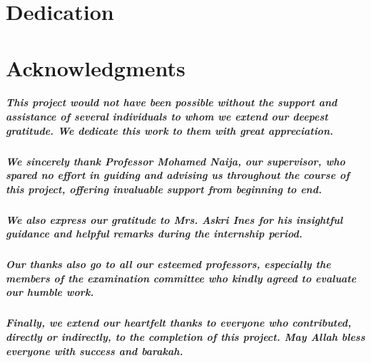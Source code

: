 \documentclass[a4paper,12pt]{report}
\begin{document}

\dominitoc
\newpage
\thispagestyle{empty}
\mbox{}
\newpage

\chapter*{Dedication}
\newpage

\chapter*{Acknowledgments}
\paragraph{This project would not have been possible without the support and assistance of several individuals to whom we extend our deepest gratitude. We dedicate this work to them with great appreciation.}

\paragraph{We sincerely thank Professor Mohamed Naija, our supervisor, who spared no effort in guiding and advising us throughout the course of this project, offering invaluable support from beginning to end.}

\paragraph{We also express our gratitude to Mrs. Askri Ines for his insightful guidance and helpful remarks during the internship period.}

\paragraph{Our thanks also go to all our esteemed professors, especially the members of the examination committee who kindly agreed to evaluate our humble work.}

\paragraph{Finally, we extend our heartfelt thanks to everyone who contributed, directly or indirectly, to the completion of this project. May Allah bless everyone with success and barakah.}

\newpage
\end{document}
